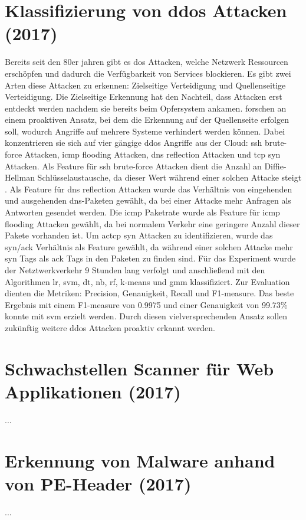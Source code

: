 \documentclass[
    12pt, %
    DIV10,
    ngerman, %
    a4paper, %
    oneside, %
    titlepage, %
    parskip=half, %
    headings=normal, %
    listof=totoc, %
    bibliography=totoc, %
    index=totoc, %
    captions=tableheading, %
    final %
]{scrreprt}
\begin{document}
\section{Klassifizierung von \ac{ddos} Attacken (2017)}
Bereits seit den 80er jahren gibt es \ac{dos} Attacken, welche Netzwerk Ressourcen erschöpfen und dadurch die Verfügbarkeit von Services blockieren. Es gibt zwei Arten diese Attacken zu erkennen: Zielseitige Verteidigung und Quellenseitige Verteidigung\parencite{He2017}. Die Zielseitige Erkennung hat den Nachteil, dass Attacken erst entdeckt werden nachdem sie bereits beim Opfersystem ankamen. \citeauthor{He2017} forschen an einem proaktiven Ansatz, bei dem die Erkennung auf der Quellenseite erfolgen soll, wodurch Angriffe auf mehrere Systeme verhindert werden können. Dabei konzentrieren sie sich auf vier gängige \ac{ddos} Angriffe aus der Cloud: \ac{ssh} brute-force Attacken, \ac{icmp} flooding Attacken, \ac{dns} reflection Attacken und \ac{tcp} \ac{syn} Attacken. Als Feature für \ac{ssh} brute-force Attacken dient die Anzahl an Diffie-Hellman Schlüsselaustausche, da dieser Wert während einer solchen Attacke steigt \parencite{He2017}. Als Feature für \ac{dns} reflection Attacken wurde das Verhältnis von eingehenden und ausgehenden \ac{dns}-Paketen gewählt, da bei einer Attacke mehr Anfragen als Antworten gesendet werden. Die \ac{icmp} Paketrate wurde als Feature für \ac{icmp} flooding Attacken gewählt, da bei normalem Verkehr eine geringere Anzahl dieser Pakete vorhanden ist. Um ac{tcp} \ac{syn} Attacken zu identifizieren, wurde das \ac{syn}/\ac{ack} Verhältnis als Feature gewählt, da während einer solchen Attacke mehr \ac{syn} Tags als \ac{ack} Tags in den Paketen zu finden sind. Für das Experiment wurde der Netztwerkverkehr 9 Stunden lang verfolgt und anschließend mit den Algorithmen \ac{lr}, \ac{svm}, \ac{dt}, \ac{nb}, \ac{rf}, k-means und \ac{gmm} klassifiziert. Zur Evaluation dienten die Metriken: Precision, Genauigkeit, Recall und F1-measure. Das beste Ergebnis mit einem F1-measure von 0.9975 und einer Genauigkeit von 99.73\% konnte mit \ac{svm} erzielt werden.
Durch diesen vielversprechenden Ansatz sollen zukünftig weitere \ac{ddos} Attacken proaktiv erkannt werden.
%
\section{Schwachstellen Scanner für Web Applikationen (2017)}
\textcite{VidyavardhakaCollegeofEngineering2017}...
%
\section{Erkennung von Malware anhand von PE-Header (2017)}
\textcite{Raff2017}...
%
\end{document}

